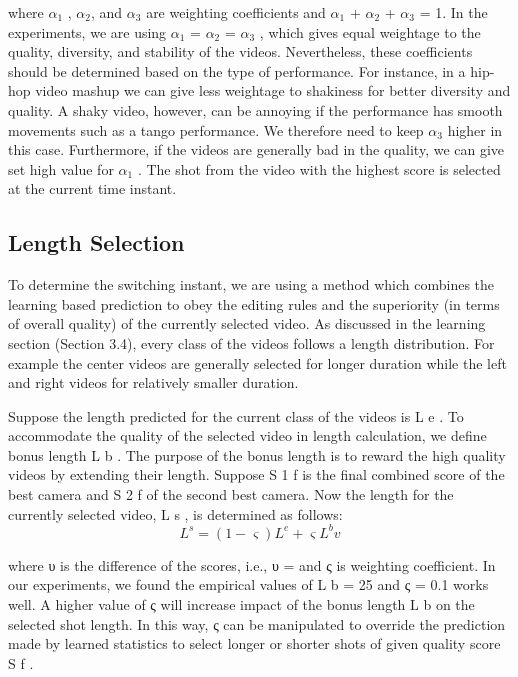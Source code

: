 \documentclass{clsfile}
\begin{document}
where ${\alpha}_1$ ,  ${\alpha}_2$, and ${\alpha}_3$ are weighting coefficients and ${\alpha}_1$ + ${\alpha}_2$ +
${\alpha}_3$ = 1. In the experiments, we are using ${\alpha}_1$ = ${\alpha}_2$ = ${\alpha}_3$ , which gives equal weightage to the quality, diversity, and stability of the videos. Nevertheless, these coefficients should be determined based on the type of performance. For instance, in a hip-hop
video mashup we can give less weightage to shakiness for better diversity and quality. A shaky video, however, can be annoying if the
performance has smooth movements such as a tango performance.
We therefore need to keep ${\alpha}_3$ higher in this case. Furthermore, if
the videos are generally bad in the quality, we can give set high
value for ${\alpha}_1$ . The shot from the video with the highest score is
selected at the current time instant.

\subsection{Length Selection}
To determine the switching instant, we are using a method which
combines the learning based prediction to obey the editing rules and
the superiority (in terms of overall quality) of the currently selected
video. As discussed in the learning section (Section 3.4), every
class of the videos follows a length distribution. For example the
center videos are generally selected for longer duration while the
left and right videos for relatively smaller duration.

Suppose the length predicted for the current class of the videos
is L e . To accommodate the quality of the selected video in length
calculation, we define bonus length L b . The purpose of the bonus
length is to reward the high quality videos by extending their length.
Suppose S 1 f is the final combined score of the best camera and S 2 f
of the second best camera. Now the length for the currently selected
video, L s , is determined as follows:
\begin{equation}
    L^s = (1 - \varsigma)L^e + \varsigma L^b v
\end{equation}

where υ is the difference of the scores, i.e., υ =
and ς is
weighting coefficient. In our experiments, we found the empirical
values of L b = 25 and ς = 0.1 works well. A higher value of
ς will increase impact of the bonus length L b on the selected shot
length. In this way, ς can be manipulated to override the prediction
made by learned statistics to select longer or shorter shots of given
quality score S f .
\end{document}
